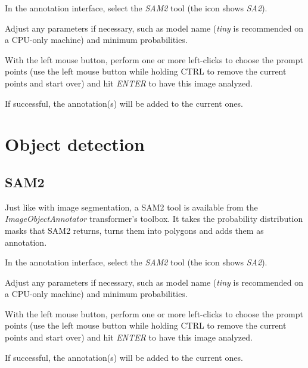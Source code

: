 \documentclass[a4paper]{book}
\begin{document}
\begin{tight_itemize}
  \item In the annotation interface, select the \textit{SAM2} tool (the icon shows \textit{SA2}).
  \item Adjust any parameters if necessary, such as model name (\textit{tiny} is recommended on a CPU-only machine)
  and minimum probabilities.
  \item With the left mouse button, perform one or more left-clicks to choose the prompt points (use the left mouse
  button while holding CTRL to remove the current points and start over) and hit \textit{ENTER} to have this image analyzed.
  \item If successful, the annotation(s) will be added to the current ones.
\end{tight_itemize}

\chapter{Object detection}
\section{SAM2}
Just like with image segmentation, a SAM2\cite{sam2} tool is available from the \textit{ImageObjectAnnotator}
transformer's toolbox. It takes the probability distribution masks that SAM2 returns, turns them into polygons
and adds them as annotation.

\begin{tight_itemize}
  \item In the annotation interface, select the \textit{SAM2} tool (the icon shows \textit{SA2}).
  \item Adjust any parameters if necessary, such as model name (\textit{tiny} is recommended on a CPU-only machine)
  and minimum probabilities.
  \item With the left mouse button, perform one or more left-clicks to choose the prompt points (use the left mouse
  button while holding CTRL to remove the current points and start over) and hit \textit{ENTER} to have this image analyzed.
  \item If successful, the annotation(s) will be added to the current ones.
\end{tight_itemize}



\end{document}
